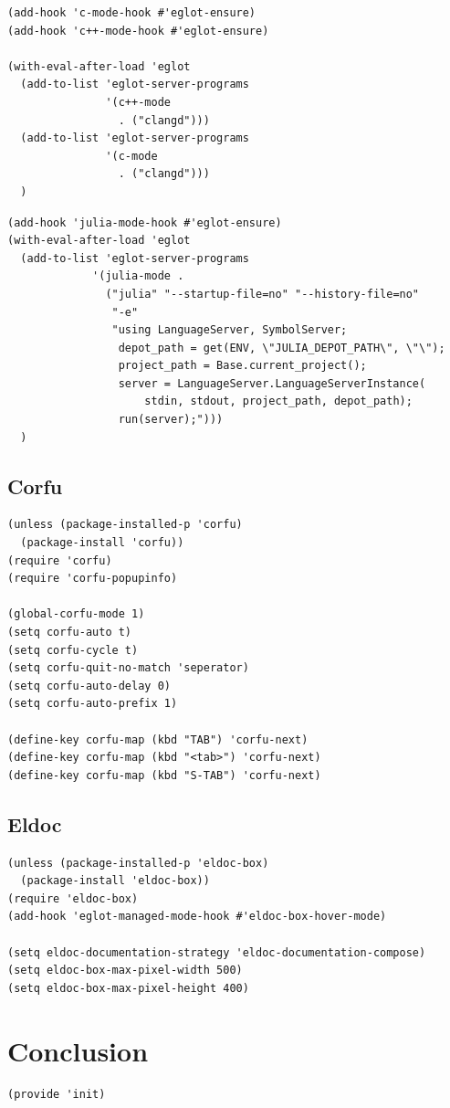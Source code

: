 \documentclass[11pt]{article}
\begin{document}
\begin{verbatim}
(add-hook 'c-mode-hook #'eglot-ensure)
(add-hook 'c++-mode-hook #'eglot-ensure)

(with-eval-after-load 'eglot
  (add-to-list 'eglot-server-programs
               '(c++-mode
                 . ("clangd")))
  (add-to-list 'eglot-server-programs
               '(c-mode
                 . ("clangd")))
  )
\end{verbatim}

\begin{verbatim}
(add-hook 'julia-mode-hook #'eglot-ensure)
(with-eval-after-load 'eglot
  (add-to-list 'eglot-server-programs
             '(julia-mode .
               ("julia" "--startup-file=no" "--history-file=no"
                "-e"
                "using LanguageServer, SymbolServer;
                 depot_path = get(ENV, \"JULIA_DEPOT_PATH\", \"\");
                 project_path = Base.current_project();
                 server = LanguageServer.LanguageServerInstance(
                     stdin, stdout, project_path, depot_path);
                 run(server);")))
  )
\end{verbatim}
\subsection{Corfu}
\label{sec:org5390e43}
\begin{verbatim}
(unless (package-installed-p 'corfu)
  (package-install 'corfu))
(require 'corfu)
(require 'corfu-popupinfo)

(global-corfu-mode 1)
(setq corfu-auto t)
(setq corfu-cycle t)
(setq corfu-quit-no-match 'seperator)
(setq corfu-auto-delay 0)
(setq corfu-auto-prefix 1)

(define-key corfu-map (kbd "TAB") 'corfu-next)
(define-key corfu-map (kbd "<tab>") 'corfu-next)
(define-key corfu-map (kbd "S-TAB") 'corfu-next)  
\end{verbatim}
\subsection{Eldoc}
\label{sec:org29e4b8d}
\begin{verbatim}
(unless (package-installed-p 'eldoc-box)
  (package-install 'eldoc-box))
(require 'eldoc-box)
(add-hook 'eglot-managed-mode-hook #'eldoc-box-hover-mode)

(setq eldoc-documentation-strategy 'eldoc-documentation-compose)
(setq eldoc-box-max-pixel-width 500)
(setq eldoc-box-max-pixel-height 400)
\end{verbatim}
\section{Conclusion}
\label{sec:org91a4ed3}
\begin{verbatim}
(provide 'init)
\end{verbatim}
\end{document}

